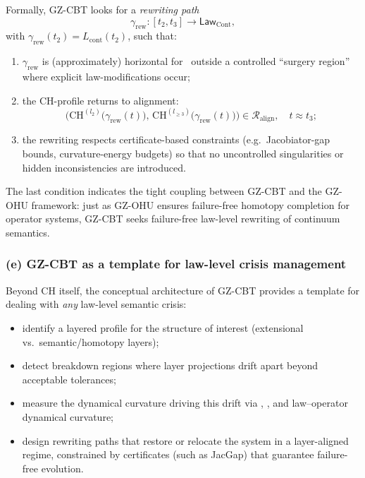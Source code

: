 \documentclass[11pt]{book}
\theoremstyle{plain}
\theoremstyle{definition}
\begin{document}
Formally, GZ-CBT looks for a \emph{rewriting path}
\[
  \gamma_{\mathrm{rew}} :
     [t_2,t_3]\longrightarrow\mathsf{Law}_{\mathrm{Cont}},
\]
with $\gamma_{\mathrm{rew}}(t_2)=L_{\mathrm{cont}}(t_2)$, such that:

\begin{enumerate}[label=\roman*)]
  \item $\gamma_{\mathrm{rew}}$ is (approximately) horizontal for
        \GZTLC\ outside a controlled “surgery region” where explicit
        law-modifications occur;
  \item the CH-profile returns to alignment:
        \[
          \bigl(
            \mathrm{CH}^{(l_2)}\bigl(\gamma_{\mathrm{rew}}(t)\bigr),\,
            \mathrm{CH}^{(l_{\ge3})}\bigl(\gamma_{\mathrm{rew}}(t)\bigr)
          \bigr)
          \in
          \mathcal{R}_{\mathrm{align}},
          \quad
          t\approx t_3;
        \]
  \item the rewriting respects certificate-based constraints (e.g.\
        Jacobiator-gap bounds, curvature-energy budgets) so that no
        uncontrolled singularities or hidden inconsistencies are
        introduced.
\end{enumerate}

The last condition indicates the tight coupling between GZ-CBT and the
GZ-OHU framework: just as GZ-OHU ensures failure-free homotopy
completion for operator systems, GZ-CBT seeks failure-free law-level
rewriting of continuum semantics.



\subsubsection*{(e) GZ-CBT as a template for law-level crisis management}

Beyond CH itself, the conceptual architecture of GZ-CBT provides a
template for dealing with \emph{any} law-level semantic crisis:

\begin{itemize}
  \item identify a layered profile for the structure of interest
        (extensional vs.\ semantic/homotopy layers);
  \item detect breakdown regions where layer projections drift apart
        beyond acceptable tolerances;
  \item measure the dynamical curvature driving this drift via
        \GZTLC, \GZLCurv, and law--operator dynamical curvature;
  \item design rewriting paths that restore or relocate the system in
        a layer-aligned regime, constrained by certificates (such as
        JacGap) that guarantee failure-free evolution.
\end{itemize}
\end{document}
